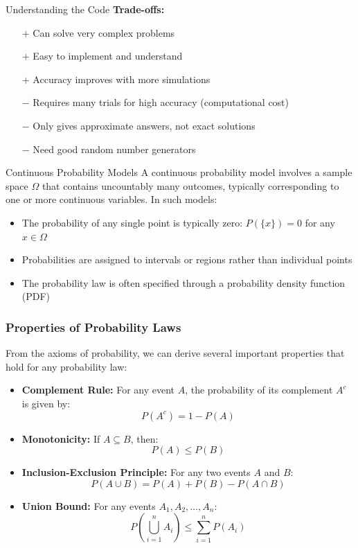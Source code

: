 \begin{keyconceptboxbreak}{Understanding the Code}
\textbf{Trade-offs:}

\begin{itemize}
    \item[$+$] Can solve very complex problems
    \item[$+$] Easy to implement and understand
    \item[$+$] Accuracy improves with more simulations
    \item[$-$] Requires many trials for high accuracy (computational cost)
    \item[$-$] Only gives approximate answers, not exact solutions
    \item[$-$] Need good random number generators
\end{itemize}

\end{keyconceptboxbreak}

\begin{definitionboxbreak}{Continuous Probability Models}
A continuous probability model involves a sample space $\Omega$ that contains uncountably many outcomes, typically corresponding to one or more continuous variables. In such models:
\begin{itemize}
    \item The probability of any single point is typically zero: $P(\{x\}) = 0$ for any $x \in \Omega$
    \item Probabilities are assigned to intervals or regions rather than individual points
    \item The probability law is often specified through a probability density function (PDF)
\end{itemize}
\end{definitionboxbreak}

\subsubsection{Properties of Probability Laws}

From the axioms of probability, we can derive several important properties that hold for any probability law:
\begin{itemize}
    \item \textbf{Complement Rule:} For any event \(A\), the probability of its complement \(A^c\) is given by:
    \[ P(A^c) = 1 - P(A) \]
    \item \textbf{Monotonicity:} If \(A \subseteq B\), then:
    \[ P(A) \leq P(B) \]
    \item \textbf{Inclusion-Exclusion Principle:} For any two events \(A\) and \(B\):
    \[ P(A \cup B) = P(A) + P(B) - P(A \cap B) \]
    \item \textbf{Union Bound:} For any events \(A_1, A_2, \ldots, A_n\):
    \[ P\left(\bigcup_{i=1}^{n} A_i\right) \leq \sum_{i=1}^{n} P(A_i) \]
\end{itemize}

